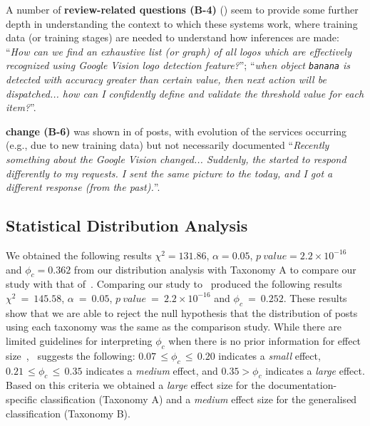 %
A number of \textbf{review-related questions (B-4)} (\PctTaxBReview{}) seem to provide some further depth in understanding the context to which these systems work, where training data (or training stages) are needed to understand how inferences are made: ``\textit{How can we find an exhaustive list (or graph) of all logos which are effectively recognized using Google Vision logo detection feature?}''; ``\textit{when object \texttt{banana} is detected with accuracy greater than certain value, then next action will be dispatched... how can I confidently define and validate the threshold value for each item?}''.

%
\textbf{ change (B-6)} was shown in \PctTaxBAPIChange{} of posts, with evolution of the services occurring (e.g., due to new training data) but not necessarily documented ``\textit{Recently something about the Google Vision  changed... Suddenly, the  started to respond differently to my requests. I sent the same picture to the  today, and I got a different response (from the past).}''.

%


%


%

\subsection{Statistical Distribution Analysis}

We obtained the following results $\chi^2 = 131.86$, $\alpha = 0.05$, $p\ value = 2.2 \times 10^{-16}$ and $\phi_c=0.362$ from our distribution analysis with Taxonomy A to compare our study with that of~\citet{Aghajani:2019bo}. Comparing our study to~\citet{Beyer:2018fm} produced the following results $\chi^2~=~145.58$, $\alpha~=~0.05$, $p\ value~=~2.2 \times 10^{-16}$ and $\phi_c~=~0.252$. These results show that we are able to reject the null hypothesis that the distribution of posts using each taxonomy was the same as the comparison study. While there are limited guidelines for interpreting \(\phi_c\) when there is no prior information for effect size~\citep{Sun:2010ut},~\citeauthor{Sun:2010ut} suggests the following: $0.07\,\leq \phi_c\,\leq\,0.20$  indicates a \textit{small} effect, $0.21\,\leq \phi_c\,\leq\,0.35$ indicates a \textit{medium} effect, and $0.35 > \phi_c$ indicates a \textit{large} effect. Based on this criteria we obtained a \textit{large} effect size for the documentation-specific classification (Taxonomy A) and a \textit{medium} effect size for the generalised classification (Taxonomy B).

